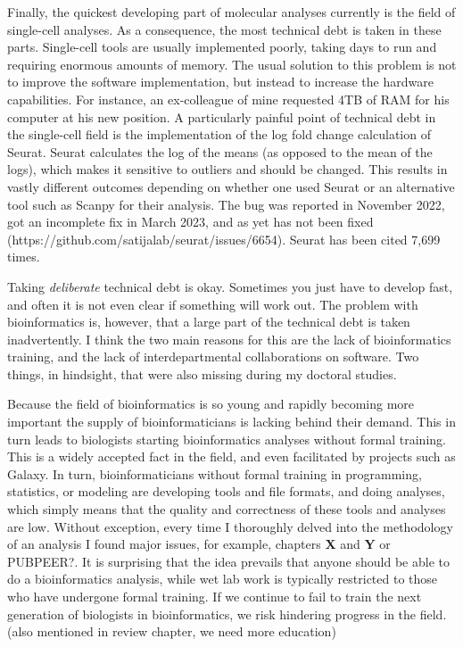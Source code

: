 Finally, the quickest developing part of molecular analyses currently is the field of single-cell analyses. As a consequence, the most technical debt is taken in these parts. Single-cell tools are usually implemented poorly, taking days to run and requiring enormous amounts of memory. The usual solution to this problem is not to improve the software implementation, but instead to increase the hardware capabilities. For instance, an ex-colleague of mine requested 4TB of RAM for his computer at his new position. A particularly painful point of technical debt in the single-cell field is the implementation of the log fold change calculation of Seurat. Seurat calculates the log of the means (as opposed to the mean of the logs), which makes it sensitive to outliers and should be changed. This results in vastly different outcomes depending on whether one used Seurat or an alternative tool such as Scanpy for their analysis. The bug was reported in November 2022, got an incomplete fix in March 2023, and as yet has not been fixed (https://github.com/satijalab/seurat/issues/6654). Seurat has been cited 7,699 times\cite{Butler2018}.

Taking \textit{deliberate} technical debt is okay. Sometimes you just have to develop fast, and often it is not even clear if something will work out. The problem with bioinformatics is, however, that a large part of the technical debt is taken inadvertently. I think the two main reasons for this are the lack of bioinformatics training, and the lack of interdepartmental collaborations on software. Two things, in hindsight, that were also missing during my doctoral studies. 

Because the field of bioinformatics is so young and rapidly becoming more important the supply of bioinformaticians is lacking behind their demand. This in turn leads to biologists starting bioinformatics analyses without formal training. This is a widely accepted fact in the field, and even facilitated by projects such as Galaxy\cite{galaxy}. In turn, bioinformaticians without formal training in programming, statistics, or modeling are developing tools and file formats, and doing analyses, which simply means that the quality and correctness of these tools and analyses are low. Without exception, every time I thoroughly delved into the methodology of an analysis I found major issues, for example, chapters \textbf{X} and \textbf{Y} or PUBPEER?. It is surprising that the idea prevails that anyone should be able to do a bioinformatics analysis, while wet lab work is typically restricted to those who have undergone formal training. If we continue to fail to train the next generation of biologists in bioinformatics, we risk hindering progress in the field.
(also mentioned in review chapter, we need more education)

